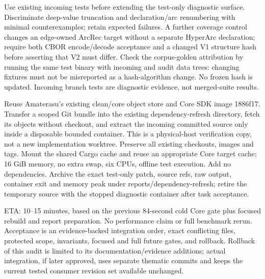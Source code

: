 \documentclass[11pt,a4paper]{article}
\begin{document}
Use existing incoming tests before extending the test-only diagnostic surface.
Discriminate deep-value truncation and declaration/arc renumbering with minimal
counterexamples; retain expected failures. A further coverage control changes
an edge-owned ArcRec target without a separate HyperArc declaration; require
both CBOR encode/decode acceptance and a changed V1 structure hash before
asserting that V2 must differ. Check the corpus-golden attribution
by running the same test binary with incoming and audit data trees: changing
fixtures must not be misreported as a hash-algorithm change. No frozen hash is
updated. Incoming branch tests are diagnostic evidence, not merged-suite results.

Reuse Amaterasu's existing clean/core object store and Core SDK image 1886f17.
Transfer a scoped Git bundle into the existing dependency-refresh directory,
fetch its objects without checkout, and extract the incoming committed source
only inside a disposable bounded container. This is a physical-host verification
copy, not a new implementation worktree. Preserve all existing checkouts, images
and tags. Mount the shared Cargo cache and reuse an appropriate Core target
cache; 16 GiB memory, no extra swap, six CPUs, offline test execution. Add no
dependencies. Archive the exact test-only patch, source refs, raw output,
container exit and memory peak under reports/dependency-refresh; retire the
temporary source with the stopped diagnostic container after task acceptance.

ETA: 10--15 minutes, based on the previous 84-second cold Core gate plus focused
rebuild and report preparation. No performance claim or full benchmark rerun.
Acceptance is an evidence-backed integration order, exact conflicting files,
protected scope, invariants, focused and full future gates, and rollback.
Rollback of this audit is limited to its documentation/evidence additions;
actual integration, if later approved, uses separate thematic commits and keeps
the current tested consumer revision set available unchanged.

\end{document}

